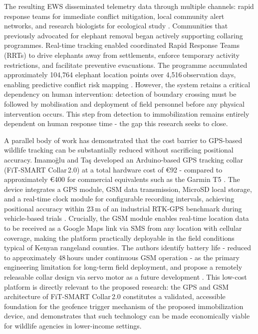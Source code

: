 \documentclass[12pt,a4paper]{article}
\begin{document}
    The resulting EWS disseminated telemetry data through multiple channels: rapid response
    teams for immediate conflict mitigation, local community alert networks, and research
    biologists for ecological study \cite{muliya2026}. Communities that previously advocated for
    elephant removal began actively supporting collaring programmes. Real-time tracking
    enabled coordinated Rapid Response Teams (RRTs) to drive elephants away from
    settlements, enforce temporary activity restrictions, and facilitate preventive evacuations.
    The programme accumulated approximately 104,764 elephant location points over
    4,516\,observation days, enabling predictive conflict risk mapping \cite{muliya2026}.
    However, the system retains a critical dependency on human intervention: detection of
    boundary crossing must be followed by mobilisation and deployment of field personnel before
    any physical intervention occurs. This step from detection to immobilization remains entirely
    dependent on human response time - the gap this research seeks to close.

    A parallel body of work has demonstrated that the cost barrier to GPS-based wildlife
    tracking can be substantially reduced without sacrificing positional accuracy. Im\-a\-mo\u{g}lu
    and Ta\c{s} developed an Arduino-based GPS tracking collar (FiT-SMART Collar\,2.0) at a
    total hardware cost of \euro{}92 - compared to approximately \euro{}400 for commercial
    equivalents such as the Garmin T5 \cite{imamoglu2022}. The device integrates a GPS module,
    GSM data transmission, MicroSD local storage, and a real-time clock module for
    configurable recording intervals, achieving positional accuracy within 23\,m of an
    industrial RTK-GPS benchmark during vehicle-based trials \cite{imamoglu2022}. Crucially,
    the GSM module enables real-time location data to be received as a Google Maps link via
    SMS from any location with cellular coverage, making the platform practically deployable
    in the field conditions typical of Kenyan rangeland counties. The authors identify
    battery life - reduced to approximately 48\,hours under continuous GSM operation -
    as the primary engineering limitation for long-term field deployment, and propose
    a remotely releasable collar design via servo motor as a future development
    \cite{imamoglu2022}. This low-cost platform is directly relevant to the proposed research:
    the GPS and GSM architecture of FiT-SMART Collar\,2.0 constitutes a validated, accessible
    foundation for the geofence trigger mechanism of the proposed immobilization device, and
    demonstrates that such technology can be made economically viable for wildlife agencies
    in lower-income settings.
\end{document}
